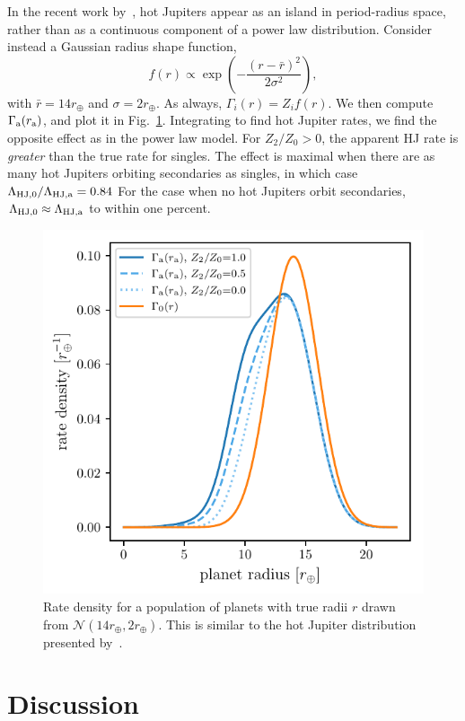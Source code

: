 \documentclass[12pt,modern]{aastex61}
\renewcommand{\a}{_{\rm a}}
\begin{document}
In the recent work by~\citet{petigura_CKS_2017}, hot Jupiters appear as an 
island in period-radius space, rather than as a continuous component of a 
power law distribution.
Consider instead a Gaussian radius shape function,
\begin{equation}
f(r) \propto \exp \left( -\frac{(r-\bar{r})^2}{2\sigma^2} \right),
\end{equation}
with $\bar{r} = 14r_\oplus$ and $\sigma = 2r_\oplus$.
As always, $\Gamma_i(r) = Z_i f(r)$.
We then compute $\Gamma\a(r\a)$, and plot it in Fig.~\ref{fig:gaussian_HJ}.
Integrating to find hot Jupiter rates,
we find the opposite effect as in the power law model.
For $Z_2/Z_0>0$, 
the apparent HJ rate is {\it greater} than the true rate for singles.
The effect is maximal when there are as many hot Jupiters orbiting secondaries 
as singles, in which case
$\Lambda_{{\rm HJ},0}/\Lambda_{\rm HJ,a} = 0.84$
For the case when no hot Jupiters orbit secondaries, $\Lambda_{{\rm HJ},0} 
\approx \Lambda_{\rm HJ,a}$ to within one percent.

\begin{figure}[!tb]
    \centering
    \includegraphics[width=.6\textwidth]{figures/int_rate_density_vs_radius_model_7_rpu_22.5_manyZs.pdf}
    \caption{
        Rate density for a population of planets with true radii $r$ drawn from
        $\mathcal{N}(14r_\oplus,2r_\oplus)$.
        This is similar to the hot Jupiter distribution presented 
        by~\citet{petigura_CKS_2017}.
    }
    \label{fig:gaussian_HJ}
\end{figure}


%

\section{Discussion}
\label{sec:discussion}
\end{document}
